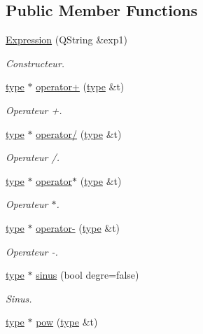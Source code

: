 \subsection*{Public Member Functions}
\begin{DoxyCompactItemize}
\item 
\hyperlink{class_expression_a2dfc0f1fe384a18adb7064f44aca0bed}{Expression} (Q\-String \&exp1)
\begin{DoxyCompactList}\small\item\em Constructeur. \end{DoxyCompactList}\item 
\hyperlink{classtype}{type} $\ast$ \hyperlink{class_expression_a1572f9f1d8b2619b14d7d58f72a63e22}{operator+} (\hyperlink{classtype}{type} \&t)
\begin{DoxyCompactList}\small\item\em Operateur +. \end{DoxyCompactList}\item 
\hyperlink{classtype}{type} $\ast$ \hyperlink{class_expression_aeb3e786f0524b1b1e2c5b238c8d2e50c}{operator/} (\hyperlink{classtype}{type} \&t)
\begin{DoxyCompactList}\small\item\em Operateur /. \end{DoxyCompactList}\item 
\hyperlink{classtype}{type} $\ast$ \hyperlink{class_expression_a9f63512e41bb2e498951342759a6fa1e}{operator$\ast$} (\hyperlink{classtype}{type} \&t)
\begin{DoxyCompactList}\small\item\em Operateur $\ast$. \end{DoxyCompactList}\item 
\hyperlink{classtype}{type} $\ast$ \hyperlink{class_expression_adb495f245e3652e3605b290d7d41acb5}{operator-\/} (\hyperlink{classtype}{type} \&t)
\begin{DoxyCompactList}\small\item\em Operateur -\/. \end{DoxyCompactList}\item 
\hyperlink{classtype}{type} $\ast$ \hyperlink{class_expression_a67a5046f6af705fef094ff5e4a78880d}{sinus} (bool degre=false)
\begin{DoxyCompactList}\small\item\em Sinus. \end{DoxyCompactList}\item 
\hyperlink{classtype}{type} $\ast$ \hyperlink{class_expression_aeaf521221894a0012b604cc0033518b9}{pow} (\hyperlink{classtype}{type} \&t)

\end{DoxyCompactItemize}
